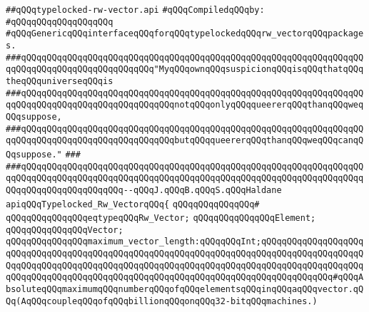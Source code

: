 \label{src/lib/std/src/typelocked-rw-vector.api}
\verb|##qQQqtypelocked-rw-vector.api|\newline
\newline
\verb|#qQQqCompiledqQQqby:|\newline
\verb|#qQQqqQQqqQQqqQQqqQQq|\newline
\newline
\newline
\newline
\verb|#qQQqGenericqQQqinterfaceqQQqforqQQqtypelockedqQQqrw_vectorqQQqpackages.|\newline
\newline
\newline
\newline
\verb|###qQQqqQQqqQQqqQQqqQQqqQQqqQQqqQQqqQQqqQQqqQQqqQQqqQQqqQQqqQQqqQQqqQQqqQQqqQQqqQQqqQQqqQQqqQQqqQQq"MyqQQqownqQQqsuspicionqQQqisqQQqthatqQQqtheqQQquniverseqQQqis|\newline
\verb|###qQQqqQQqqQQqqQQqqQQqqQQqqQQqqQQqqQQqqQQqqQQqqQQqqQQqqQQqqQQqqQQqqQQqqQQqqQQqqQQqqQQqqQQqqQQqqQQqqQQqnotqQQqonlyqQQqqueererqQQqthanqQQqweqQQqsuppose,|\newline
\verb|###qQQqqQQqqQQqqQQqqQQqqQQqqQQqqQQqqQQqqQQqqQQqqQQqqQQqqQQqqQQqqQQqqQQqqQQqqQQqqQQqqQQqqQQqqQQqqQQqqQQqbutqQQqqueererqQQqthanqQQqweqQQqcanqQQqsuppose."|\newline
\verb|###|\newline
\verb|###qQQqqQQqqQQqqQQqqQQqqQQqqQQqqQQqqQQqqQQqqQQqqQQqqQQqqQQqqQQqqQQqqQQqqQQqqQQqqQQqqQQqqQQqqQQqqQQqqQQqqQQqqQQqqQQqqQQqqQQqqQQqqQQqqQQqqQQqqQQqqQQqqQQqqQQqqQQqqQQq--qQQqJ.qQQqB.qQQqS.qQQqHaldane|\newline
\newline
\newline
\newline
\verb|apiqQQqTypelocked_Rw_VectorqQQq{|\newline
\verb|qQQqqQQqqQQqqQQq#|\newline
\verb|qQQqqQQqqQQqqQQqeqtypeqQQqRw_Vector;|\newline
\verb|qQQqqQQqqQQqqQQqElement;|\newline
\verb|qQQqqQQqqQQqqQQqVector;|\newline
\newline
\verb|qQQqqQQqqQQqqQQqmaximum_vector_length:qQQqqQQqInt;qQQqqQQqqQQqqQQqqQQqqQQqqQQqqQQqqQQqqQQqqQQqqQQqqQQqqQQqqQQqqQQqqQQqqQQqqQQqqQQqqQQqqQQqqQQqqQQqqQQqqQQqqQQqqQQqqQQqqQQqqQQqqQQqqQQqqQQqqQQqqQQqqQQqqQQqqQQqqQQqqQQqqQQqqQQqqQQqqQQqqQQqqQQqqQQqqQQqqQQqqQQqqQQqqQQqqQQqqQQqqQQq#qQQqAbsoluteqQQqmaximumqQQqnumberqQQqofqQQqelementsqQQqinqQQqaqQQqvector.qQQq(AqQQqcoupleqQQqofqQQqbillionqQQqonqQQq32-bitqQQqmachines.)|\newline
